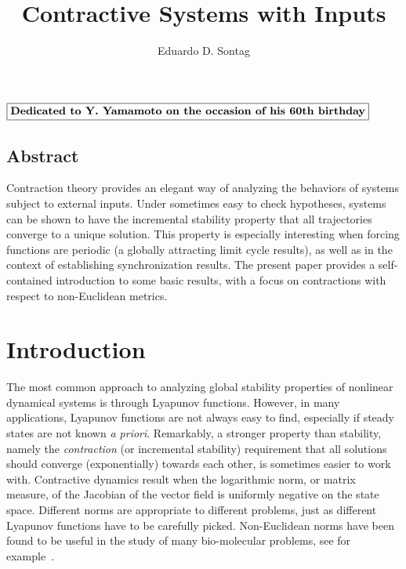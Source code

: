 \documentclass{svmult}
\title*{Contractive Systems with Inputs}
\author{Eduardo D. Sontag}
\institute{Department of Mathematics\\
Rutgers University\\
USA\\
\texttt{sontag@math.rutgers.edu}}
\begin{document}
\maketitle

\medskip

\centerline{$\framebox{\bf Dedicated to Y. Yamamoto on the occasion of his 60th birthday}$}

\bigskip

\subsection*{Abstract}

Contraction theory provides an elegant way of analyzing the behaviors of
systems subject to external inputs.  Under sometimes easy to check hypotheses,
systems can be shown to have the incremental stability property that all
trajectories converge to a unique solution.  This property is especially
interesting when forcing functions are periodic (a globally attracting limit
cycle results), as well as in the context of establishing synchronization
results.  The present paper provides a self-contained introduction to some
basic results, with a focus on contractions with respect to non-Euclidean
metrics.

\section{Introduction}


The most common approach to analyzing global stability properties of nonlinear
dynamical systems is through Lyapunov functions.
However, in many applications, Lyapunov functions are not always
easy to find, especially if steady states are not known \emph{a priori}.
Remarkably, a stronger property than stability, namely the \emph{contraction}
(or incremental stability) requirement that all solutions should converge
(exponentially) towards each other, is sometimes easier to work with.
Contractive dynamics result when the logarithmic norm, or matrix measure, of
the Jacobian of the vector field is uniformly negative on the state space.
Different norms are appropriate to different problems, just as different
Lyapunov functions have to be carefully picked.
Non-Euclidean norms have been found to be useful in the study of many
bio-molecular problems, see for example~\cite{russo_dibernardo_sontag}.
\end{document}
